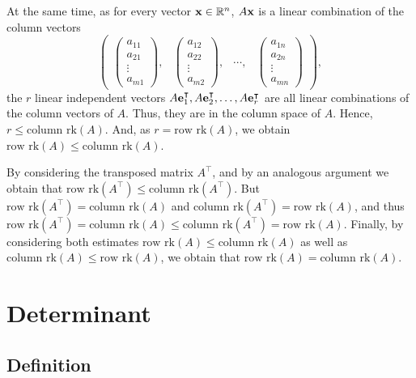 {At the same time,
as
for every vector ${\bf x}\in {\Bbb R}^n$,
$A{\bf x}$ is a linear combination of the column vectors
$$
\begin{pmatrix}
\begin{pmatrix}
a_{11}\\
a_{21}\\
\vdots \\
a_{m1}
\end{pmatrix},
&
\begin{pmatrix}
a_{12}\\
a_{22}\\
\vdots \\
a_{m2}
\end{pmatrix},
&
\cdots  ,
&
\begin{pmatrix}
a_{1n}\\
a_{2n}\\
\vdots \\
a_{mn}
\end{pmatrix}
\end{pmatrix}
,
$$
the $r$ linear independent vectors
$A{\bf e}_1^\intercal ,A{\bf e}_2^\intercal , \ldots ,A{\bf e}_r^\intercal $
are all linear combinations of the column vectors of $A$.
Thus, they are in the column space of $A$.
Hence, $r\le \textrm{column rk}(A)$.
And, as $r= \textrm{row rk}(A)$,
we obtain
$ \textrm{row rk}(A)\le \textrm{column rk}(A)$.

By considering the transposed matrix $A^\intercal $, and by an analogous argument   we obtain
that
$ \textrm{row rk}(A^\intercal )\le \textrm{column rk}(A^\intercal )$.
But
$ \textrm{row rk}(A^\intercal )= \textrm{column rk}(A)$
and
$ \textrm{column rk}(A^\intercal )= \textrm{row rk}(A)$,
and thus
$ \textrm{row rk}(A^\intercal )= \textrm{column rk}(A)\le \textrm{column rk}(A^\intercal )= \textrm{row rk}(A)$.
Finally, by considering both estimates
$ \textrm{row rk}(A)\le \textrm{column rk}(A)$
as well as
$\textrm{column rk}(A)\le \textrm{row rk}(A)$,
we obtain that
$ \textrm{row rk}(A) = \textrm{column rk}(A)$.
\eproof
}

\section{Determinant}

\subsection{Definition}

